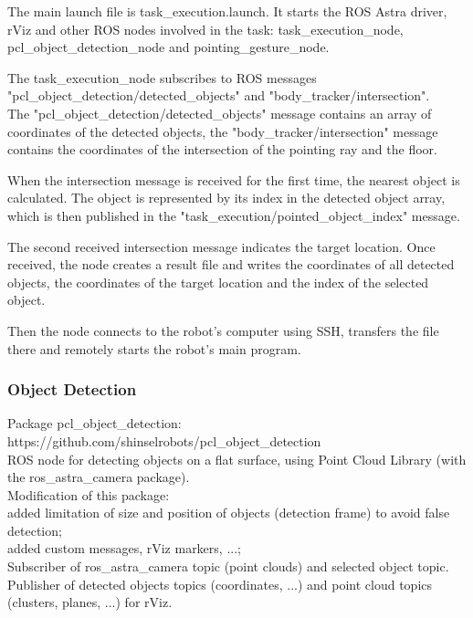 The main launch file is task\_execution.launch. It starts the ROS Astra driver, rViz and other ROS nodes involved in the task: task\_execution\_node, pcl\_object\_detection\_node and pointing\_gesture\_node.\par
The task\_execution\_node subscribes to ROS messages\\
"pcl\_object\_detection/detected\_objects" and "body\_tracker/intersection".\\
The "pcl\_object\_detection/detected\_objects" message contains an array of coordinates of the detected objects, the "body\_tracker/intersection" message contains the coordinates of the intersection of the pointing ray and the floor.\par
When the intersection message is received for the first time, the nearest object is calculated. The object is represented by its index in the detected object array, which is then published in the "task\_execution/pointed\_object\_index" message.\par
The second received intersection message indicates the target location.
Once received, the node creates a result file and writes the coordinates of all detected objects, the coordinates of the target location and the index of the selected object.\par
Then the node connects to the robot's computer using SSH, transfers the file there and remotely starts the robot's main program.\par

\subsubsection{Object Detection}
Package pcl\_object\_detection:\\
https://github.com/shinselrobots/pcl\_object\_detection\\
ROS node for detecting objects on a flat surface, using Point Cloud Library (with the ros\_astra\_camera package).\\

Modification of this package: \\
added limitation of size and position of objects (detection frame) to avoid false detection;\\
added custom messages, rViz markers, ...;\\

Subscriber of ros\_astra\_camera topic (point clouds) and selected object topic.\\
Publisher of detected objects topics (coordinates, ...) and point cloud topics (clusters, planes, ...) for rViz.\\

